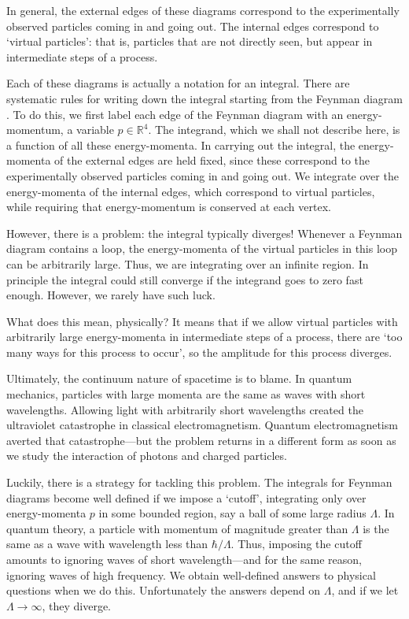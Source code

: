 \documentclass{article}
\newcommand{\R}{\mathbb{R}}
\begin{document}
In general, the external edges of these diagrams correspond to the experimentally observed particles coming in and going out.  The internal edges correspond to `virtual particles': that is, particles that are not directly seen, but appear in intermediate steps of a process.

Each of these diagrams is actually a notation for an integral. There are systematic rules for writing down the integral starting from the Feynman diagram \cite{IZ,PS}.  To do this, we first label each edge of the Feynman diagram with an energy-momentum, a variable $p \in \R^4$.   The integrand, which we shall not describe here, is a function of all these energy-momenta.  In carrying out the integral, the energy-momenta of the external edges are held fixed, since these correspond to the experimentally observed particles coming in and going out.  We integrate over the energy-momenta of the internal edges, which correspond to virtual particles, while requiring that energy-momentum is conserved at each vertex.  

However, there is a problem: the integral typically diverges!  Whenever a Feynman diagram contains a loop, the energy-momenta of the virtual particles in this loop can be arbitrarily large.  Thus, we are integrating over an infinite region.  In principle the integral could still converge if the integrand goes to zero fast enough.   However, we rarely have such luck.

What does this mean, physically?  It means that if we allow virtual particles with arbitrarily large energy-momenta in intermediate steps of a process, there are `too many ways for this process to occur', so the amplitude for this process diverges.  

Ultimately, the continuum nature of spacetime is to blame.  In quantum mechanics, particles with large momenta are the same as waves with short wavelengths.   Allowing light with arbitrarily short wavelengths created the ultraviolet catastrophe in classical electromagnetism.  Quantum electromagnetism averted that catastrophe---but the problem returns in a different form as soon as we study the interaction of photons and charged particles.

Luckily, there is a strategy for tackling this problem. The integrals for Feynman diagrams become well defined if we impose a `cutoff', integrating only over energy-momenta $p$ in some bounded region, say a ball of some large radius $\Lambda$.   In quantum theory, a particle with momentum of magnitude greater than $\Lambda$ is the same as a wave with wavelength less than $\hbar/\Lambda$.    Thus, imposing the cutoff amounts to ignoring waves of short wavelength---and for the same reason, ignoring waves of high frequency.   We obtain well-defined answers to physical questions when we do this.  Unfortunately the answers depend on $\Lambda$, and if we let $\Lambda \to \infty$, they diverge.
\end{document}
